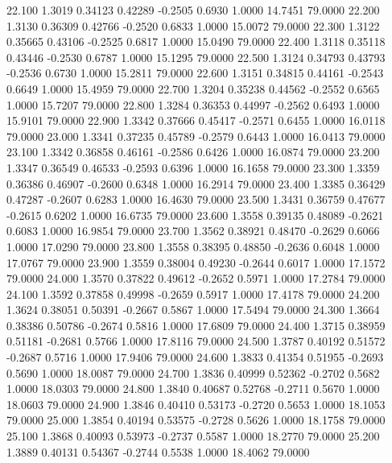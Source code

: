   22.100   1.3019   0.34123   0.42289  -0.2505   0.6930   1.0000  14.7451  79.0000
  22.200   1.3130   0.36309   0.42766  -0.2520   0.6833   1.0000  15.0072  79.0000
  22.300   1.3122   0.35665   0.43106  -0.2525   0.6817   1.0000  15.0490  79.0000
  22.400   1.3118   0.35118   0.43446  -0.2530   0.6787   1.0000  15.1295  79.0000
  22.500   1.3124   0.34793   0.43793  -0.2536   0.6730   1.0000  15.2811  79.0000
  22.600   1.3151   0.34815   0.44161  -0.2543   0.6649   1.0000  15.4959  79.0000
  22.700   1.3204   0.35238   0.44562  -0.2552   0.6565   1.0000  15.7207  79.0000
  22.800   1.3284   0.36353   0.44997  -0.2562   0.6493   1.0000  15.9101  79.0000
  22.900   1.3342   0.37666   0.45417  -0.2571   0.6455   1.0000  16.0118  79.0000
  23.000   1.3341   0.37235   0.45789  -0.2579   0.6443   1.0000  16.0413  79.0000
  23.100   1.3342   0.36858   0.46161  -0.2586   0.6426   1.0000  16.0874  79.0000
  23.200   1.3347   0.36549   0.46533  -0.2593   0.6396   1.0000  16.1658  79.0000
  23.300   1.3359   0.36386   0.46907  -0.2600   0.6348   1.0000  16.2914  79.0000
  23.400   1.3385   0.36429   0.47287  -0.2607   0.6283   1.0000  16.4630  79.0000
  23.500   1.3431   0.36759   0.47677  -0.2615   0.6202   1.0000  16.6735  79.0000
  23.600   1.3558   0.39135   0.48089  -0.2621   0.6083   1.0000  16.9854  79.0000
  23.700   1.3562   0.38921   0.48470  -0.2629   0.6066   1.0000  17.0290  79.0000
  23.800   1.3558   0.38395   0.48850  -0.2636   0.6048   1.0000  17.0767  79.0000
  23.900   1.3559   0.38004   0.49230  -0.2644   0.6017   1.0000  17.1572  79.0000
  24.000   1.3570   0.37822   0.49612  -0.2652   0.5971   1.0000  17.2784  79.0000
  24.100   1.3592   0.37858   0.49998  -0.2659   0.5917   1.0000  17.4178  79.0000
  24.200   1.3624   0.38051   0.50391  -0.2667   0.5867   1.0000  17.5494  79.0000
  24.300   1.3664   0.38386   0.50786  -0.2674   0.5816   1.0000  17.6809  79.0000
  24.400   1.3715   0.38959   0.51181  -0.2681   0.5766   1.0000  17.8116  79.0000
  24.500   1.3787   0.40192   0.51572  -0.2687   0.5716   1.0000  17.9406  79.0000
  24.600   1.3833   0.41354   0.51955  -0.2693   0.5690   1.0000  18.0087  79.0000
  24.700   1.3836   0.40999   0.52362  -0.2702   0.5682   1.0000  18.0303  79.0000
  24.800   1.3840   0.40687   0.52768  -0.2711   0.5670   1.0000  18.0603  79.0000
  24.900   1.3846   0.40410   0.53173  -0.2720   0.5653   1.0000  18.1053  79.0000
  25.000   1.3854   0.40194   0.53575  -0.2728   0.5626   1.0000  18.1758  79.0000
  25.100   1.3868   0.40093   0.53973  -0.2737   0.5587   1.0000  18.2770  79.0000
  25.200   1.3889   0.40131   0.54367  -0.2744   0.5538   1.0000  18.4062  79.0000
